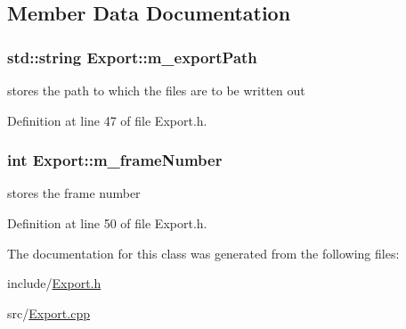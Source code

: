 \subsection{Member Data Documentation}
\hypertarget{class_export_a118e0991b8d0a147dabb306f2baa7d42}{
\subsubsection[{m\_\-exportPath}]{\setlength{\rightskip}{0pt plus 5cm}std::string {\bf Export::m\_\-exportPath}}}
\label{class_export_a118e0991b8d0a147dabb306f2baa7d42}


stores the path to which the files are to be written out 



Definition at line 47 of file Export.h.

\hypertarget{class_export_aba7efe1cc8dc348c756d65868a9bc929}{
\subsubsection[{m\_\-frameNumber}]{\setlength{\rightskip}{0pt plus 5cm}int {\bf Export::m\_\-frameNumber}}}
\label{class_export_aba7efe1cc8dc348c756d65868a9bc929}


stores the frame number 



Definition at line 50 of file Export.h.



The documentation for this class was generated from the following files:\begin{DoxyCompactItemize}
\item 
include/\hyperlink{_export_8h}{Export.h}\item 
src/\hyperlink{_export_8cpp}{Export.cpp}\end{DoxyCompactItemize}

